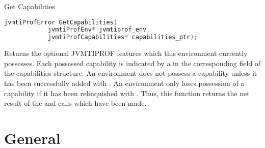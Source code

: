 \begin{apidef}{Get Capabilities}
\begin{lstlisting}[language=C]
jvmtiProfError GetCapabilities(
            jvmtiProfEnv* jvmtiprof_env,
            jvmtiProfCapabilities* capabilities_ptr);
\end{lstlisting}

\begin{apidesc}
Returns the optional JVMTIPROF features which this environment currently possesses. Each possessed capability is indicated by a  in the corresponding field of the capabilities structure. An environment does not possess a capability unless it has been successfully added with . An environment only loses possession of a capability if it has been relinquished with . Thus, this function returns the net result of the  and  calls which have been made. 
\end{apidesc}

\begin{apiphase}
\apiphaseany
\end{apiphase}

\begin{apicap}
\apicaprequired
\end{apicap}

\begin{apiparam}
\end{apiparam}

\apireturnempty

\begin{apierror}
\end{apierror}
\end{apidef}

\section{General}

